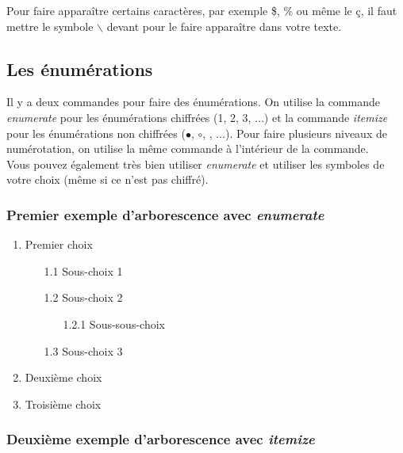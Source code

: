 \documentclass[12pt,twoside,a4paper]{article}
\begin{document}
	Pour faire apparaître certains caractères, par exemple \$, \% ou même le \c c, il faut mettre le symbole $\backslash$ devant pour le faire apparaître dans votre texte. 
	
	\subsection{Les énumérations}
	
	Il y a deux commandes pour faire des énumérations. On utilise la commande \textit{enumerate} pour les énumérations chiffrées (1, 2, 3, $\ldots$) et la commande \textit{itemize} pour les énumérations non chiffrées ($\bullet$, $\circ$, \checked, $\ldots$). Pour faire plusieurs niveaux de numérotation, on utilise la même commande à l'intérieur de la commande. \\
	
	Vous pouvez également très bien utiliser \textit{enumerate} et utiliser les symboles de votre choix (même si ce n'est pas chiffré). 
	
	\subsubsection{Premier exemple d'arborescence avec \textit{enumerate}}
	
	\begin{enumerate} %
		\item Premier choix %
		\begin{enumerate}
			\item[1.1] Sous-choix 1
			\item[1.2] Sous-choix 2
			\begin{enumerate}
				\item[1.2.1] Sous-sous-choix
			\end{enumerate}
			\item[1.3] Sous-choix 3
		\end{enumerate}
		\item Deuxième choix
		\item Troisième choix
	\end{enumerate}
	
	\subsubsection{Deuxième exemple d'arborescence avec \textit{itemize}}
	
\end{document}
